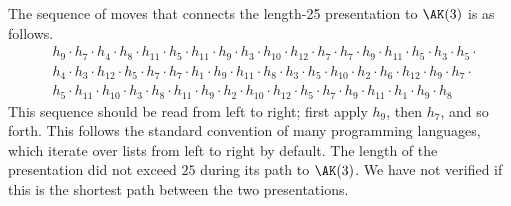 The sequence of moves that connects the length-25 presentation to $\AK(3)$ is as follows.
\[
\begin{aligned}
& h_9 \cdot h_7 \cdot h_4 \cdot h_8 \cdot h_{11} \cdot h_5 \cdot h_{11} \cdot h_9 \cdot h_3 \cdot h_{10} \cdot h_{12} \cdot h_7 \cdot h_7 \cdot h_9 \cdot h_{11} \cdot h_5 \cdot h_3 \cdot h_5 \cdot \\
& h_4 \cdot h_3 \cdot h_{12} \cdot h_5 \cdot h_7 \cdot h_7 \cdot h_1 \cdot h_9 \cdot h_{11} \cdot h_8 \cdot h_3 \cdot h_5 \cdot h_{10} \cdot h_2 \cdot h_6 \cdot h_{12} \cdot h_9 \cdot h_7 \cdot \\
& h_5 \cdot h_{11} \cdot h_{10} \cdot h_3 \cdot h_8 \cdot h_{11} \cdot h_9 \cdot h_2 \cdot h_{10} \cdot h_{12} \cdot h_5 \cdot h_7 \cdot h_9 \cdot h_{11} \cdot h_1 \cdot h_9 \cdot h_8
\end{aligned}
\]
This sequence should be read from left to right; first apply $h_9$, then $h_7$, and so forth. This follows the standard convention of many programming languages, which iterate over lists from left to right by default. The length of the presentation did not exceed $25$ during its path to $\AK(3)$. We have not verified if this is the shortest path between the two presentations.


